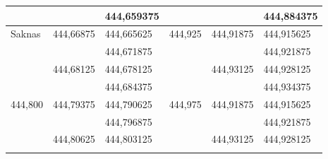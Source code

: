 \begin{table}[h]
\begin{tabular}{|l|l|l|l|l|l|}
		                                               &                                                 & 444,659375                      & \multicolumn{1}{l|}{}                         & \multicolumn{1}{l|}{}                           & \multicolumn{1}{l|}{444,884375} \\ \hline
		\multirow{4}{*}{Saknas}                        & \multirow{2}{*}{444,66875}                      & 444,665625                      & \multicolumn{1}{l|}{\multirow{4}{*}{444,925}} & \multicolumn{1}{l|}{\multirow{2}{*}{444,91875}} & \multicolumn{1}{l|}{444,915625} \\ \cline{3-3}\cline{6-6}
		                                               &                                                 & 444,671875                      & \multicolumn{1}{l|}{}                         & \multicolumn{1}{l|}{}                           & \multicolumn{1}{l|}{444,921875} \\ \cline{2-3}\cline{5-6}
		                                               & \multirow{2}{*}{444,68125}                      & 444,678125                      & \multicolumn{1}{l|}{}                         & \multicolumn{1}{l|}{\multirow{2}{*}{444,93125}} & \multicolumn{1}{l|}{444,928125} \\ \cline{3-3}\cline{6-6}
		                                               &                                                 & 444,684375                      & \multicolumn{1}{l|}{}                         & \multicolumn{1}{l|}{}                           & \multicolumn{1}{l|}{444,934375} \\ \hline
		\multirow{4}{*}{444,800}                       & \multirow{2}{*}{444,79375}                      & 444,790625                      & \multicolumn{1}{l|}{\multirow{4}{*}{444,975}} & \multicolumn{1}{l|}{\multirow{2}{*}{444,91875}} & \multicolumn{1}{l|}{444,915625} \\ \cline{3-3}\cline{6-6}
		                                               &                                                 & 444,796875                      & \multicolumn{1}{l|}{}                         & \multicolumn{1}{l|}{}                           & \multicolumn{1}{l|}{444,921875} \\ \cline{2-3}\cline{5-6}
		                                               & \multirow{2}{*}{444,80625}                      & 444,803125                      & \multicolumn{1}{l|}{}                         & \multicolumn{1}{l|}{\multirow{2}{*}{444,93125}} & \multicolumn{1}{l|}{444,928125} \\ \cline{3-3}\cline{6-6}

\end{tabular}
\end{table}
